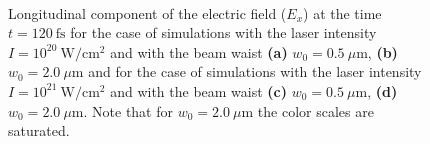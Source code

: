 \begin{figure}[h!]
	\centering
	\\[2mm]
	\caption{Longitudinal component of the electric field ($ E_{x} $) at the time $ t = 120 \ \mathrm{fs} $ for the case of simulations with the laser intensity $ I = 10^{20} \ \mathrm{W/cm^2} $ and with the beam waist \textbf{(a)} $ w_0 = 0.5 \ \mu\mathrm{m} $, \textbf{(b)} $ w_0 = 2.0 \ \mu\mathrm{m} $ and for the case of simulations with the laser intensity $ I = 10^{21} \ \mathrm{W/cm^2} $ and with the beam waist \textbf{(c)} $ w_0 = 0.5 \ \mu\mathrm{m} $, \textbf{(d)} $ w_0 = 2.0 \ \mu\mathrm{m} $. Note that for $ w_0 = 2.0 \ \mu\mathrm{m} $ the color scales are saturated.}
	\label{fig:20}
\end{figure}

